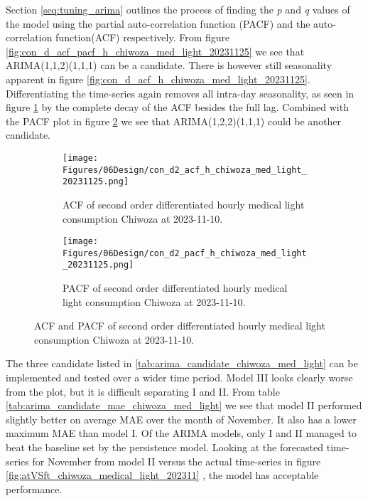 Section \ref{seq:tuning_arima} outlines the process of finding the \textit{p} and \textit{q} values of the model using the partial auto-correlation function (PACF) and the auto-correlation function(ACF) respectively. From figure \ref{fig:con_d_acf_pacf_h_chiwoza_med_light_20231125} we see that ARIMA(1,1,2)(1,1,1) can be a candidate. There is however still seasonality apparent in figure \ref{fig:con_d_acf_h_chiwoza_med_light_20231125}. Differentiating the time-series again removes all intra-day seasonality, as seen in figure \ref{fig:con_d2_acf_h_chiwoza_med_light_20231125} by the complete decay of the ACF besides the full lag. Combined with the PACF plot in figure \ref{fig:con_d2_pacf_h_chiwoza_med_light_20231125} we see that ARIMA(1,2,2)(1,1,1) could be another candidate. \\

\begin{figure}
  \centering

  \begin{subfigure}{\textwidth}
    \centering
    \texttt{[image: Figures/06Design/con\_d2\_acf\_h\_chiwoza\_med\_light\_20231125.png]}
    \caption[ACF second order differentiated medical consumption 20231110]{ACF of second order differentiated hourly medical light consumption Chiwoza at 2023-11-10.}
    \label{fig:con_d2_acf_h_chiwoza_med_light_20231125}
  \end{subfigure}

  \vspace{0.5cm}

  \begin{subfigure}{\textwidth}
    \centering
    \texttt{[image: Figures/06Design/con\_d2\_pacf\_h\_chiwoza\_med\_light\_20231125.png]}
    \caption[PACF second order differentiated medical consumption 20231110]{PACF of second order differentiated  hourly medical light consumption Chiwoza at 2023-11-10.}
    \label{fig:con_d2_pacf_h_chiwoza_med_light_20231125}
  \end{subfigure}

  \caption[ACF and PACF second order differentiated medical consumption 20231110]{ACF and PACF of second order differentiated hourly medical light consumption Chiwoza at 2023-11-10.}
  \label{fig:con_d2_acf_pacf_h_chiwoza_med_light_20231125}
\end{figure}

The three candidate listed in \ref{tab:arima_candidate_chiwoza_med_light} can be implemented and tested over a wider time period. Model III looks clearly worse from the plot, but it is difficult separating I and II. From table \ref{tab:arima_candidate_mae_chiwoza_med_light} we see that model II performed slightly better on average MAE over the month of November. It also has a lower maximum MAE than model I. Of the ARIMA models, only I and II managed to beat the baseline set by the persistence model. Looking at the forecasted time-series for November from model II versus the actual time-series in figure \ref{fig:atVSft_chiwoza_medical_light_202311} , the model has acceptable performance. 

